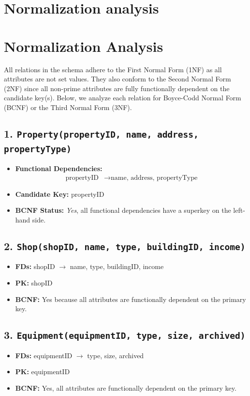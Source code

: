 \documentclass[11pt]{scrartcl}
\begin{document}
\section{Normalization analysis}
\section*{Normalization Analysis}

All relations in the schema adhere to the First Normal Form (1NF) as all attributes are not set values. 
They also conform to the Second Normal Form (2NF) since all non-prime attributes are fully functionally dependent on the candidate key(s). 
Below, we analyze each relation for Boyce-Codd Normal Form (BCNF) or the Third Normal Form (3NF).

\subsection*{1. \texttt{Property(propertyID, name, address, propertyType)}}
\begin{itemize}[leftmargin=2em]
  \item \textbf{Functional Dependencies:}
    \begin{align*}
      \text{propertyID} &\rightarrow \text{name, address, propertyType}
    \end{align*}
  \item \textbf{Candidate Key:} propertyID
  \item \textbf{BCNF Status:} \textit{Yes}, all functional dependencies have a superkey on the left-hand side.
\end{itemize}

\subsection*{2. \texttt{Shop(shopID, name, type, buildingID, income)}}
\begin{itemize}
  \item \textbf{FDs:} shopID $\rightarrow$ name, type, buildingID, income
  \item \textbf{PK:} shopID
  \item \textbf{BCNF:} Yes because all attributes are functionally dependent on the primary key.
\end{itemize}

\subsection*{3. \texttt{Equipment(equipmentID, type, size, archived)}}
\begin{itemize}
  \item \textbf{FDs:} equipmentID $\rightarrow$ type, size, archived
  \item \textbf{PK:} equipmentID
  \item \textbf{BCNF:} Yes, all attributes are functionally dependent on the primary key.
\end{itemize}
\end{document}
